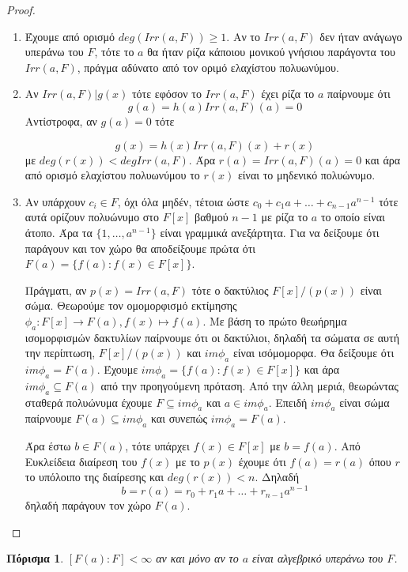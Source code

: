\documentclass[oneside,a4paper]{article}
\newtheorem{cor}{Πόρισμα}
\begin{document}
\begin{proof} $ $

	\begin{enumerate}
	\item Έχουμε από ορισμό $deg(Irr(a,F))\geq 1$. Αν το $Irr(a,F)$ δεν ήταν ανάγωγο υπεράνω του $F$, τότε το $a$ θα ήταν ρίζα κάποιου μονικού γνήσιου παράγοντα του $Irr(a,F)$, πράγμα αδύνατο από τον οριμό ελαχίστου πολυωνύμου.
	\item Αν $Irr(a,F) | g(x)$ τότε εφόσον το $Irr(a,F)$ έχει ρίζα το $a$ παίρνουμε ότι 
	$$g(a) = h(a)Irr(a,F)(a) = 0$$ 
	Αντίστροφα, αν $g(a) = 0$ τότε 

	$$g(x) = h(x) Irr(a,F)(x) + r(x)$$
	με $deg(r(x)) < deg Irr(a,F)$. Άρα $r(a) = Irr(a,F)(a) = 0$ και άρα από ορισμό ελαχίστου πολυωνύμου το $r(x)$ είναι το μηδενικό πολυώνυμο.
	\item Αν υπάρχουν $c_i \in F$, όχι όλα μηδέν, τέτοια ώστε $c_0 + c_1 a + \ldots + c_{n-1} a^{n-1}$ τότε αυτά ορίζουν πολυώνυμο στο $F[x]$ βαθμού $n-1$ με ρίζα το $a$ το οποίο είναι άτοπο. Άρα τα $\{1,\ldots,a^{n-1}\}$ είναι γραμμικά ανεξάρτητα. Για να δείξουμε ότι παράγουν και τον χώρο θα αποδείξουμε πρώτα ότι $F(a) = \{f(a): f(x) \in F[x]\}$.
	
	Πράγματι, αν $p(x) = Irr(a,F)$ τότε ο δακτύλιος $F[x]/(p(x))$ είναι σώμα. Θεωρούμε τον ομομορφισμό εκτίμησης $\phi_a : F[x] \rightarrow F(a), f(x) \mapsto f(a)$. Με βάση το πρώτο θεωήρημα ισομορφισμών δακτυλίων παίρνουμε ότι οι δακτύλιοι, δηλαδή τα σώματα σε αυτή την περίπτωση, $F[x]/(p(x))$ και $im\phi_a$ είναι ισόμομορφα. Θα δείξουμε ότι $im\phi_a = F(a)$. Έχουμε $im\phi_a = \{f(a) : f(x) \in F[x]\}$ και άρα $im\phi_a \subseteq F(a)$ από την προηγούμενη πρόταση. Από την άλλη μεριά, θεωρώντας σταθερά πολυώνυμα έχουμε $F \subseteq im\phi_a$ και $a\in im\phi_a$. Επειδή $im\phi_a$ είναι σώμα παίρνουμε $F(a) \subseteq im\phi_a$ και συνεπώς $im\phi_a = F(a)$.

	Άρα έστω $b \in F(a)$, τότε υπάρχει $f(x) \in F[x]$ με $b=f(a)$. Από Ευκλείδεια διαίρεση του $f(x)$ με το $p(x)$ έχουμε ότι $f(a) = r(a)$ όπου $r$ το υπόλοιπο της διαίρεσης και $deg(r(x)) < n$. Δηλαδή
	$$b = r(a) = r_0 + r_1 a + \ldots + r_{n-1} a^{n-1}$$
	δηλαδή παράγουν τον χώρο $F(a)$.
	\end{enumerate}
\end{proof}

\begin{cor}  $[F(a): F] < \infty$ αν και μόνο αν το $a$ είναι αλγεβρικό υπεράνω του $F$.
\end{cor}
\end{document}
